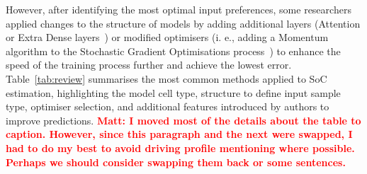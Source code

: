 However, after identifying the most optimal input preferences, some researchers applied changes to the structure of models by adding additional layers (Attention or Extra Dense layers~\cite{mamo_long_2020, jiao_gru-rnn_2020}) or modified optimisers (i. e., adding a Momentum algorithm to the Stochastic Gradient Optimisations process~\cite{xiao_accurate_2019}) to enhance the speed of the training process further and achieve the lowest error.
\mbox{Table~\ref{tab:review}} summarises the most common methods applied to SoC estimation, highlighting the model cell type, structure to define input sample type, optimiser selection, and additional features introduced by authors to improve predictions.
\textcolor{red}{\textbf{Matt: I moved most of the details about the table to caption. However, since this paragraph and the next were swapped, I had to do my best to avoid driving profile mentioning where possible. Perhaps we should consider swapping them back or some sentences.}}
